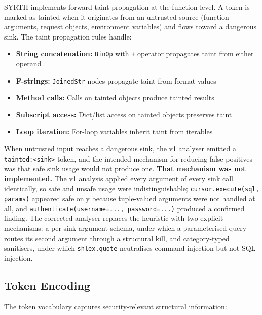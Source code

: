 \documentclass[12pt,a4paper]{article}
\begin{document}
SYRTH implements forward taint propagation at the function level. A token is marked as tainted when it originates from an untrusted source (function arguments, request objects, environment variables) and flows toward a dangerous sink. The taint propagation rules handle:

\begin{itemize}
    \item \textbf{String concatenation:} \texttt{BinOp} with \texttt{+} operator propagates taint from either operand
    \item \textbf{F-strings:} \texttt{JoinedStr} nodes propagate taint from format values
    \item \textbf{Method calls:} Calls on tainted objects produce tainted results
    \item \textbf{Subscript access:} Dict/list access on tainted objects preserves taint
    \item \textbf{Loop iteration:} For-loop variables inherit taint from iterables
\end{itemize}

When untrusted input reaches a dangerous sink, the v1 analyser emitted a \texttt{tainted:<sink>} token, and the intended mechanism for reducing false positives was that safe sink usage would not produce one. \textbf{That mechanism was not implemented.} The v1 analysis applied every argument of every sink call identically, so safe and unsafe usage were indistinguishable; \texttt{cursor.execute(sql, params)} appeared safe only because tuple-valued arguments were not handled at all, and \texttt{authenticate(username=..., password=...)} produced a confirmed finding. The corrected analyser replaces the heuristic with two explicit mechanisms: a per-sink argument schema, under which a parameterised query routes its second argument through a structural kill, and category-typed sanitisers, under which \texttt{shlex.quote} neutralises command injection but not SQL injection.

\subsection{Token Encoding}
\label{sec:token}

The token vocabulary captures security-relevant structural information:
\end{document}
